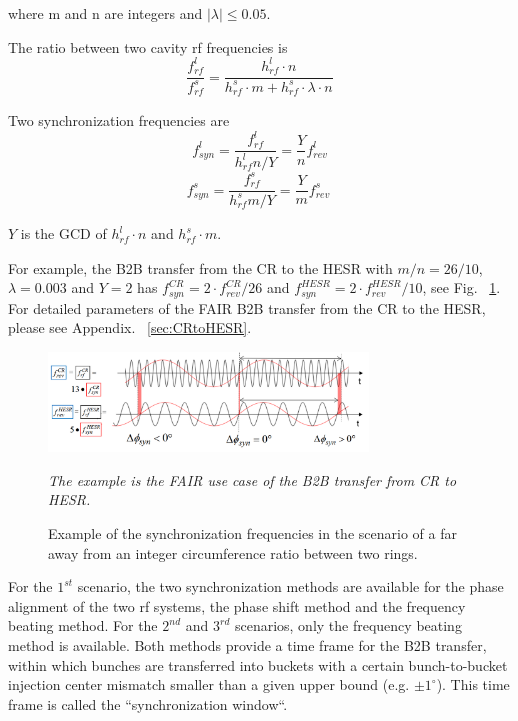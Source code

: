 \begin{itemize}
{where m and n are integers and $|\lambda|\le0.05$.

The ratio between two cavity rf frequencies is 
\begin{equation}
\label{ratio_away_int}
\frac{f_{\mathit{rf}}^{l}}{f_{\mathit{rf}}^{s}}=\frac{h^l_\mathit{rf}\cdot n}{h^s_\mathit{rf} \cdot m+h^s_\mathit{rf} \cdot\lambda\cdot n}
\end{equation}

Two synchronization frequencies are
\begin{equation}
f_{\mathit{syn}}^{l}=\frac{f_{\mathit{rf}}^{l}}{h^l_\mathit{rf}n/Y}=\frac{Y}{n}f_{\mathit{rev}}^{l} \label{synch_freq111_r}
\end{equation}
\begin{equation}
f_{\mathit{syn}}^{s}=\frac{f_{\mathit{rf}}^{s}}{h^s_\mathit{rf}m/Y}=\frac{Y}{m}f_{\mathit{rev}}^{s} \ \label{synch_freq222_r}
\end{equation}

$Y$ is the GCD of $h^l_\mathit{rf}\cdot n$ and $h^s_\mathit{rf} \cdot m$.


For example, the B2B transfer from the CR to the HESR with $m/n=26/10$, $\lambda=0.003$ and $Y=2$ has $f_{\mathit{syn}}^{CR}=2\cdot f_{\mathit{rev}}^{CR}/26$ and $f_{\mathit{syn}}^{HESR}=2\cdot f_{\mathit{rev}}^{HESR}/10$, see Fig. ~\ref{CR-HESR}. For detailed parameters of the FAIR B2B transfer from the CR to the HESR, please see Appendix. ~\ref{sec:CRtoHESR}. 
\begin{figure}[!htb]
   \centering   
   \includegraphics*[width=85mm]{CR-HESR.png}
   \caption{Example of the synchronization frequencies in the scenario of a far away from an integer circumference ratio between two rings.}
{\textsl{\small{The example is the FAIR use case of the B2B transfer from CR to HESR.}}}
   \label{CR-HESR}
\end{figure} 
}
\end{itemize}
For the $1^{st}$ scenario, the two synchronization methods are available for the phase alignment of the two rf systems, the phase shift method and the frequency beating method. For the $2^{nd}$ and $3^{rd}$ scenarios, only the frequency beating method is available. Both methods provide a time frame for the B2B transfer, within which bunches are transferred into buckets with a certain bunch-to-bucket injection center mismatch smaller than a given upper bound (e.g. $\pm1^\circ$). This time frame is called the “synchronization window“. 

